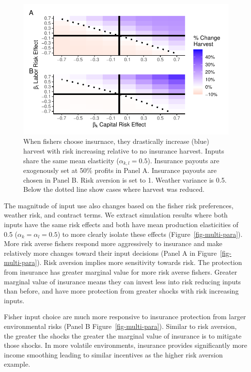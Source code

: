\documentclass[
  letterpaper,
  DIV=11,
  numbers=noendperiod]{scrartcl}
\theoremstyle{plain}
\theoremstyle{plain}
\theoremstyle{remark}
\begin{document}
\begin{figure}

{\centering \includegraphics{ibi-behavior_files/figure-pdf/fig-multi-h-even-hi-1.pdf}

}

\caption{\label{fig-multi-h-even-hi}When fishers choose insurnace, they
drastically increase (blue) harvest with risk increasing relative to no
insurance harvest. Inputs share the same mean elasticity
(\(\alpha_{k,l}=0.5\)). Insurance payouts are exogenously set at 50\%
profits in Panel A. Insurance payouts are chosen in Panel B. Risk
aversion is set to 1. Weather variance is 0.5. Below the dotted line
show cases where harvest was reduced.}

\end{figure}

The magnitude of input use also changes based on the fisher risk
preferences, weather risk, and contract terms. We extract simulation
results where both inputs have the same risk effects and both have mean
production elasticities of 0.5 (\(\alpha_k=\alpha_l=0.5\)) to more
clearly isolate these effects (Figure~\ref{fig-multi-para}). More risk
averse fishers respond more aggressively to insurance and make
relatively more changes toward their input decisions (Panel A in
Figure~\ref{fig-multi-para}). Risk aversion implies more sensitivity
towards risk. The protection from insurance has greater marginal value
for more risk averse fishers. Greater marginal value of insurance means
they can invest less into risk reducing inputs than before, and have
more protection from greater shocks with risk increasing inputs.

Fisher input choice are much more responsive to insurance protection
from larger environmental risks (Panel B Figure~\ref{fig-multi-para}).
Similar to risk aversion, the greater the shocks the greater the
marginal value of insurance is to mitigate those shocks. In more
volatile environments, insurance provides significantly more income
smoothing leading to similar incentives as the higher risk aversion
example.
\end{document}
